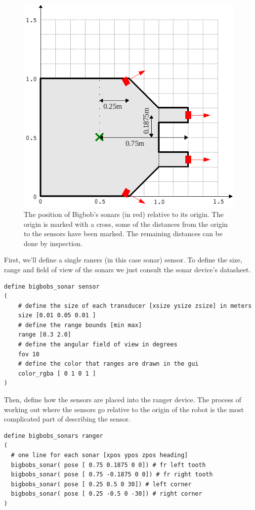 \documentclass[a4paper]{report}
\begin{document}
\begin{figure}
	\centering
	\includegraphics[width=0.6\linewidth]{./pics/robot_building/bigbob_sonars.png} 
	\caption{The position of Bigbob's sonars (in red) relative to its origin. The origin is marked with a cross, some of the distances from the origin to the sensors have been marked. The remaining distances can be done by inspection.}
	\label{fig:BuildingAWorld:BuildingRobot:ExampleRobot:RobotSensors:Sonars}
\end{figure}

First, we'll define a single raners (in this case sonar) sensor.
To define the size, range and field of view of the sonars we just consult the
sonar device's datasheet.  
\begin{verbatim}
define bigbobs_sonar sensor
(
    # define the size of each transducer [xsize ysize zsize] in meters
    size [0.01 0.05 0.01 ] 
    # define the range bounds [min max]
    range [0.3 2.0]
    # define the angular field of view in degrees
    fov 10
    # define the color that ranges are drawn in the gui
    color_rgba [ 0 1 0 1 ] 
)
\end{verbatim}

Then, define how the sensors are placed into the ranger device.
The process of working out where the sensors go relative to the origin of the
robot is the most complicated part of describing the sensor.
\begin{verbatim}
define bigbobs_sonars ranger
( 
  # one line for each sonar [xpos ypos zpos heading]
  bigbobs_sonar( pose [ 0.75 0.1875 0 0]) # fr left tooth
  bigbobs_sonar( pose [ 0.75 -0.1875 0 0]) # fr right tooth
  bigbobs_sonar( pose [ 0.25 0.5 0 30]) # left corner
  bigbobs_sonar( pose [ 0.25 -0.5 0 -30]) # right corner
)
\end{verbatim}
\end{document}
